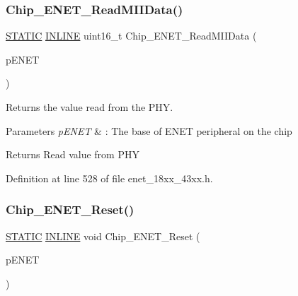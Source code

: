\subsubsection{\texorpdfstring{Chip\+\_\+\+E\+N\+E\+T\+\_\+\+Read\+M\+I\+I\+Data()}{Chip\_ENET\_ReadMIIData()}}
{\footnotesize\ttfamily \hyperlink{group___l_p_c___types___public___macros_ga10b2d890d871e1489bb02b7e70d9bdfb}{S\+T\+A\+T\+IC} \hyperlink{spifi__18xx__43xx_8h_a2eb6f9e0395b47b8d5e3eeae4fe0c116}{I\+N\+L\+I\+NE} uint16\+\_\+t Chip\+\_\+\+E\+N\+E\+T\+\_\+\+Read\+M\+I\+I\+Data (\begin{DoxyParamCaption}\item[{\hyperlink{struct_l_p_c___e_n_e_t___t}{L\+P\+C\+\_\+\+E\+N\+E\+T\+\_\+T} $\ast$}]{p\+E\+N\+ET }\end{DoxyParamCaption})}



Returns the value read from the P\+HY. 


\begin{DoxyParams}{Parameters}
{\em p\+E\+N\+ET} & \+: The base of E\+N\+ET peripheral on the chip \\
\hline
\end{DoxyParams}
\begin{DoxyReturn}{Returns}
Read value from P\+HY 
\end{DoxyReturn}


Definition at line 528 of file enet\+\_\+18xx\+\_\+43xx.\+h.

\mbox{\label{group___e_n_e_t__18_x_x__43_x_x_gae6567d8fb1d427ecf30ce65f48a074b4}} 
\subsubsection{\texorpdfstring{Chip\+\_\+\+E\+N\+E\+T\+\_\+\+Reset()}{Chip\_ENET\_Reset()}}
{\footnotesize\ttfamily \hyperlink{group___l_p_c___types___public___macros_ga10b2d890d871e1489bb02b7e70d9bdfb}{S\+T\+A\+T\+IC} \hyperlink{spifi__18xx__43xx_8h_a2eb6f9e0395b47b8d5e3eeae4fe0c116}{I\+N\+L\+I\+NE} void Chip\+\_\+\+E\+N\+E\+T\+\_\+\+Reset (\begin{DoxyParamCaption}\item[{\hyperlink{struct_l_p_c___e_n_e_t___t}{L\+P\+C\+\_\+\+E\+N\+E\+T\+\_\+T} $\ast$}]{p\+E\+N\+ET }\end{DoxyParamCaption})}



